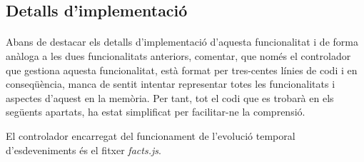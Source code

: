\subsection{Detalls d'implementació}

    \paragraph{}
    Abans de destacar els detalls d'implementació d'aquesta funcionalitat i de forma anàloga a les dues funcionalitats anteriors, comentar, que només el controlador que gestiona aquesta funcionalitat, està format per tres-centes línies de codi i en conseqüència, manca de sentit intentar representar totes les funcionalitats i aspectes d'aquest en la memòria. Per tant, tot el codi que es trobarà en els següents apartats, ha estat simplificat per facilitar-ne la comprensió.

    El controlador encarregat del funcionament de l'evolució temporal d'esdeveniments és el fitxer \emph{facts.js}.

    
    
    
